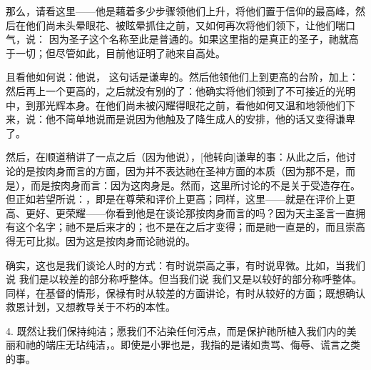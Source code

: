 那么，请看这里——他是藉着多少步骤领他们上升，将他们置于信仰的最高峰，然后在他们尚未头晕眼花、被眩晕抓住之前，又如何再次将他们领下，让他们喘口气，说：  因为圣子这个名称至此是普通的。如果这里指的是真正的圣子，祂就高于一切；但尽管如此，目前他证明了祂来自高处。\par

且看他如何说：他说， 这句话是谦卑的。然后他领他们上到更高的台阶，加上：然后再上一个更高的，之后就没有别的了：他确实将他们领到了不可接近的光明中，到那光辉本身。在他们尚未被闪耀得眼花之前，看他如何又温和地领他们下来，说：他不简单地说而是说因为他触及了降生成人的安排，他的话又变得谦卑了。\par

然后，在顺道稍讲了一点之后（因为他说），[他转向]谦卑的事：从此之后，他讨论的是按肉身而言的方面，因为并不表达祂在圣神方面的本质（因为那不是，而是），而是按肉身而言：因为这肉身是。然而，这里所讨论的不是关于受造存在。但正如若望所说：，即是在尊荣和评价上更高；同样，这里——就是在评价上更高、更好、更荣耀——你看到他是在谈论那按肉身而言的吗？因为天主圣言一直拥有这个名字；祂不是后来才的；也不是在之后才变得；而是祂一直是的，而且崇高得无可比拟。因为这是按肉身而论祂说的。\par

确实，这也是我们谈论人时的方式：有时说崇高之事，有时说卑微。比如，当我们说  我们是以较差的部分称呼整体。但当我们说 我们又是以较好的部分称呼整体。同样，在基督的情形，保禄有时从较差的方面讲论，有时从较好的方面；既想确认救恩计划，又想教导关于不朽的本性。\par

4. 既然让我们保持纯洁；愿我们不沾染任何污点，而是保护祂所植入我们内的美丽和祂的端庄无玷纯洁，。即使是小罪也是，我指的是诸如责骂、侮辱、谎言之类的事。\par

